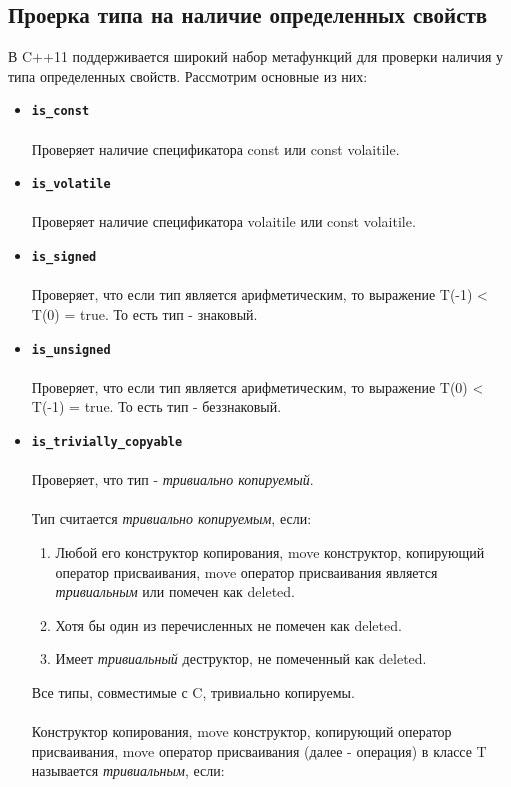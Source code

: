 \subsection{Проерка типа на наличие определенных свойств}
В C++11 поддерживается широкий набор метафункций для проверки наличия у типа определенных свойств. Рассмотрим основные из них:
\begin{itemize}
\item \textbf{\texttt{is\_const}} \\\\
Проверяет наличие спецификатора const или const volaitile.
\item \textbf{\texttt{is\_volatile}} \\\\
Проверяет наличие спецификатора volaitile или const volaitile.
\item \textbf{\texttt{is\_signed}} \\\\
Проверяет, что если тип является арифметическим, то выражение T(-1) < T(0) = true.
То есть тип - знаковый.
\item \textbf{\texttt{is\_unsigned}} \\\\
Проверяет, что если тип является арифметическим, то выражение T(0) < T(-1) = true.
То есть тип - беззнаковый.
\item \texttt{\textbf{is\_trivially\_copyable}} \\\\
Проверяет, что тип - \textit{тривиально копируемый}. \\\\
Тип считается \textit{тривиально копируемым}, если:
\begin{enumerate} 
\item Любой его конструктор копирования, move конструктор, копирующий оператор присваивания, 
move оператор присваивания является \textit{тривиальным} или помечен как deleted.
\item Хотя бы один из перечисленных не помечен как deleted.
\item Имеет \textit{тривиальный} деструктор, не помеченный как deleted.
\end{enumerate}
Все типы, совместимые с C, тривиально копируемы. \\\\
Конструктор копирования, move конструктор, копирующий оператор присваивания, 
move оператор присваивания (далее - операция) в классе T называется \textit{тривиальным}, если:
\begin{enumerate} 

\end{enumerate}
\end{itemize}
